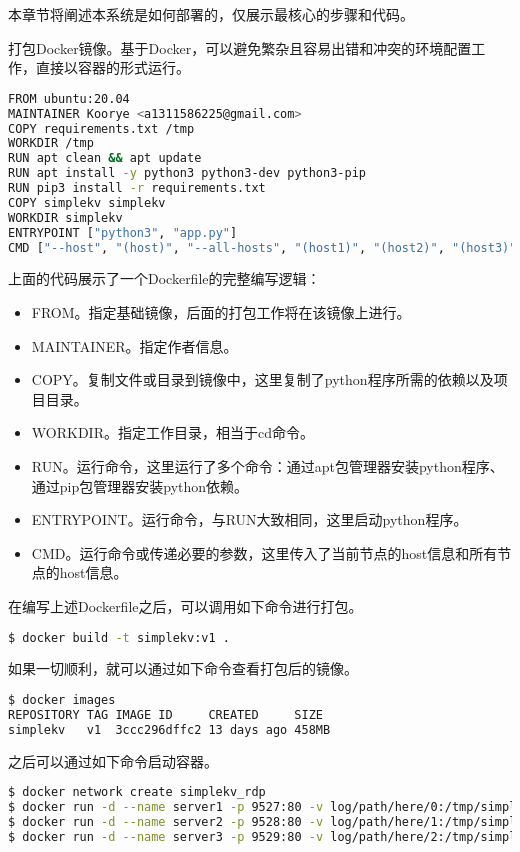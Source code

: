 本章节将阐述本系统是如何部署的，仅展示最核心的步骤和代码。

打包Docker镜像。基于Docker，可以避免繁杂且容易出错和冲突的环境配置工作，直接以容器的形式运行。

\newpage

\begin{lstlisting}[language=Bash]
FROM ubuntu:20.04
MAINTAINER Koorye <a1311586225@gmail.com>
COPY requirements.txt /tmp
WORKDIR /tmp
RUN apt clean && apt update
RUN apt install -y python3 python3-dev python3-pip
RUN pip3 install -r requirements.txt
COPY simplekv simplekv
WORKDIR simplekv
ENTRYPOINT ["python3", "app.py"]
CMD ["--host", "(host)", "--all-hosts", "(host1)", "(host2)", "(host3)"]
\end{lstlisting}

上面的代码展示了一个Dockerfile的完整编写逻辑：
\begin{itemize}
    \item FROM。指定基础镜像，后面的打包工作将在该镜像上进行。
    \item MAINTAINER。指定作者信息。
    \item COPY。复制文件或目录到镜像中，这里复制了python程序所需的依赖以及项目目录。
    \item WORKDIR。指定工作目录，相当于cd命令。
    \item RUN。运行命令，这里运行了多个命令：通过apt包管理器安装python程序、通过pip包管理器安装python依赖。
    \item ENTRYPOINT。运行命令，与RUN大致相同，这里启动python程序。
    \item CMD。运行命令或传递必要的参数，这里传入了当前节点的host信息和所有节点的host信息。
\end{itemize}

在编写上述Dockerfile之后，可以调用如下命令进行打包。

\begin{lstlisting}[language=Bash]
$ docker build -t simplekv:v1 .
\end{lstlisting}

如果一切顺利，就可以通过如下命令查看打包后的镜像。

\begin{lstlisting}[language=Bash]
$ docker images
REPOSITORY TAG IMAGE ID     CREATED     SIZE
simplekv   v1  3ccc296dffc2 13 days ago 458MB
\end{lstlisting}

之后可以通过如下命令启动容器。

\begin{lstlisting}[language=Bash]
$ docker network create simplekv_rdp
$ docker run -d --name server1 -p 9527:80 -v log/path/here/0:/tmp/simplekv/logs --net simplekv_rdp simplekv:v1 --host server1 --all-hosts server1 server2 server3
$ docker run -d --name server2 -p 9528:80 -v log/path/here/1:/tmp/simplekv/logs --net simplekv_rdp simplekv:v1 --host server2 --all-hosts server1 server2 server3
$ docker run -d --name server3 -p 9529:80 -v log/path/here/2:/tmp/simplekv/logs --net simplekv_rdp simplekv:v1 --host server3 --all-hosts server1 server2 server3
\end{lstlisting}

